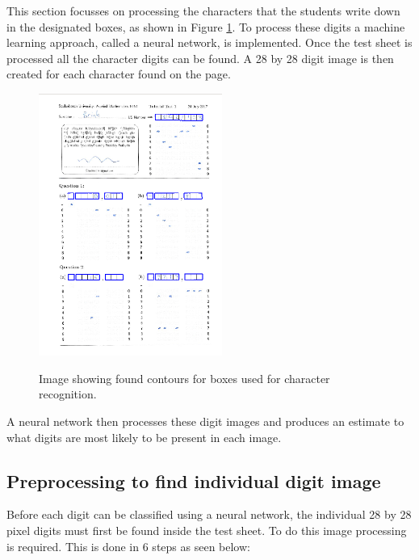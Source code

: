 This section focusses on processing the characters that the students write down in the designated boxes, as shown in Figure \ref{fig:sa}. To process these digits a machine learning approach, called a neural network, is implemented. Once the test sheet is processed all the character digits can be found. A 28 by 28 digit image is then created for each character found on the page.
\begin{figure}
  \centering
  \includegraphics[width=6cm]{DigitScan}\\
  \caption{Image showing found contours for boxes used for character recognition.}
  \label{fig:sa}
\end{figure}

A neural network then processes these digit images and produces an estimate to what digits are most likely to be present in each image.

\subsection{Preprocessing to find individual digit image}
\label{sec:preprocess}

Before each digit can be classified using a neural network, the individual 28 by 28 pixel digits must first be found inside the test sheet. To do this image processing is required. This is done in 6 steps as seen below:


